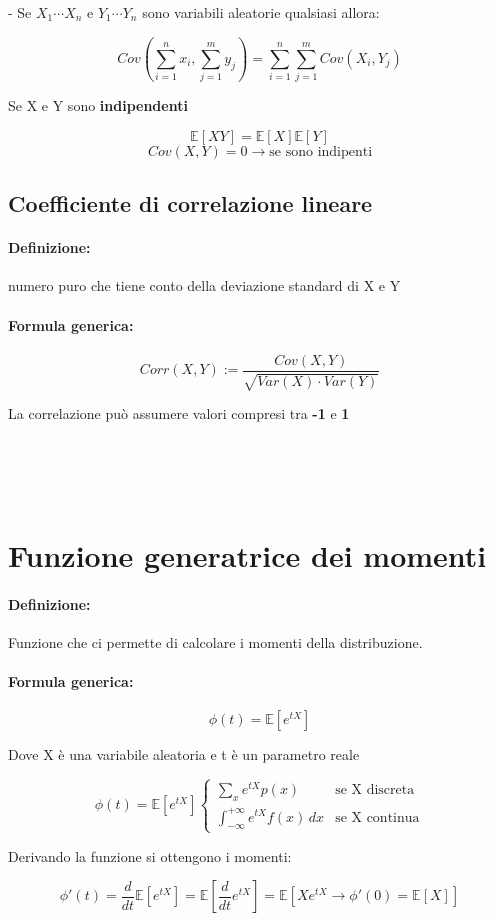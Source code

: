 \documentclass[]{article}
\newcommand{\ev}{\mathbb{E}[X]}
\renewcommand{\ev}[1]{\mathbb{E}[#1]}
\newcommand{\definizione}{\paragraph{Definizione:}}
\newcommand{\formula}{\paragraph{Formula generica:}}
\begin{document}
    \centerline{- Se $X_1 \cdots X_n$ e $Y_1 \cdots Y_n$ sono variabili aleatorie qualsiasi allora:}
    \[ Cov(\sum_{i = 1}^{n}x_i, \sum_{j = 1}^{m} y_j) = \sum_{i = 1}^{n} \sum_{j = 1}^{m} Cov(X_i, Y_j) \]
    \linebreak[10]
    \centerline{Se X e Y sono \textbf{indipendenti}}
    \[ \ev{XY} = \ev{X} \ev{Y} \]
    \[ Cov(X, Y) = 0 \longrightarrow \text{se sono indipenti}\]

    
    \subsection{Coefficiente di correlazione lineare}
    \definizione numero puro che tiene conto della deviazione standard di X e Y
    \formula
    \begin{equation*}
        Corr(X,Y) := \frac{Cov(X,Y)}{\sqrt{Var(X) \cdot Var(Y)}}
    \end{equation*}

    \begin{center}
        La correlazione può assumere valori compresi tra \textbf{-1} e \textbf{1}
    \end{center}
     \\
     \\
     \\

    \newpage
    \section{Funzione generatrice dei momenti}
    \definizione Funzione che ci permette di calcolare i momenti della distribuzione.
    \formula \[ \phi(t) = \ev{e^{tX}}\]
    \begin{center}
        Dove X è una variabile aleatoria e t è un parametro reale
    \end{center}

    \begin{equation*}
        \phi(t) = \ev{e^{tX}} 
        \begin{cases}
            \sum_{x}^{} e^{tX}p(x) & \text{se X discreta} \\
            \int_{-\infty}^{+\infty} e^{tX} f(x) \, dx & \text{se X continua}
        \end{cases}
    \end{equation*}
    \linebreak[10]
    \centerline{Derivando la funzione si ottengono i momenti:}
    \[ \phi'(t) = \frac{d}{dt} \ev{e^{tX}} = \ev{\frac{d}{dt} e^{tX}} = \ev{Xe^{tX} \longrightarrow \phi'(0) = \ev{X}}\]
\end{document}
